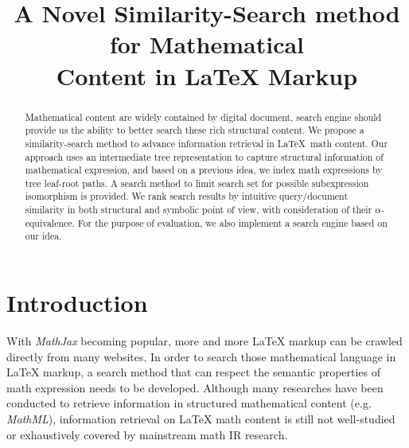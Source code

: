 \documentclass{acm_proc_article-sp}
\begin{document}
\title{A Novel Similarity-Search method for Mathematical \\ Content in {\ttlit LaTeX} Markup}


\maketitle
\begin{abstract}
Mathematical content are widely contained by digital document, search engine should provide us the ability to better search these rich structural content.
We propose a similarity-search method to advance information retrieval in \LaTeX\ math content.
Our approach uses an intermediate tree representation to capture structural information of mathematical expression, and based on a previous idea, we index math expressions by tree leaf-root paths. 
A search method to limit search set for possible subexpression isomorphism is provided.
We rank search results by intuitive query/document similarity in both structural and symbolic point of view, with consideration of their $\alpha$-equivalence. 
For the purpose of evaluation, we also implement a search engine based on our idea. 
\end{abstract}



\section{Introduction}
\label{intro}
With \textit{MathJax} becoming popular, more and more \LaTeX{} markup can be crawled directly from many websites. 
In order to search those mathematical language in \LaTeX{} markup, a search method that can respect the semantic properties of math expression needs to be developed. 
Although many researches have been conducted to retrieve information in structured mathematical content (e.g. \textit{MathML}), information retrieval on \LaTeX{} math content is still not well-studied or exhaustively covered by mainstream math IR research.
\end{document}
